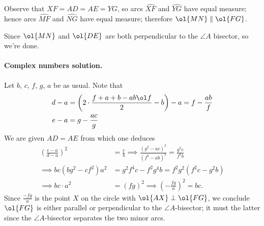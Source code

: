 Observe that $XF = AD = AE = YG$,
so arcs $\widehat{XF}$ and $\widehat{YG}$ have equal measure;
hence arcs $\widehat{MF}$ and $\widehat{NG}$ have equal measure;
therefore $\ol{MN} \parallel \ol{FG}$.

Since $\ol{MN}$ and $\ol{DE}$ are both perpendicular
to the $\angle A$ bisector, so we're done.

\paragraph{Complex numbers solution.}
Let $b$, $c$, $f$, $g$, $a$ be as usual.
Note that
\begin{align*}
  d-a &= \left( 2 \cdot \frac{f+a+b-ab\ol f}{2} -b \right)-a
    = f - \frac{ab}{f} \\
  e-a &= g - \frac{ac}{g}
\end{align*}
We are given $AD = AE$ from which one deduces
\begin{align*}
  \left( \frac{e-a}{d-a} \right)^2 &= \frac cb
  \implies \frac{(g^2-ac)^2}{(f^2-ab)^2} = \frac{g^2 c}{f^2 b} \\
  \implies bc(bg^2-cf^2)a^2 &= g^2f^4c - f^2g^4b = f^2g^2(f^2c-g^2b) \\
  \implies bc \cdot a^2 &= (fg)^2 \implies \left( -\frac{fg}{a} \right)^2 = bc.
\end{align*}
Since $\frac{-fg}{a}$ is the point $X$ on the circle
with $\ol{AX} \perp \ol{FG}$,
we conclude $\ol{FG}$ is either parallel or perpendicular
to the $\angle A$-bisector; it must the latter
since the $\angle A$-bisector separates the two minor arcs.

